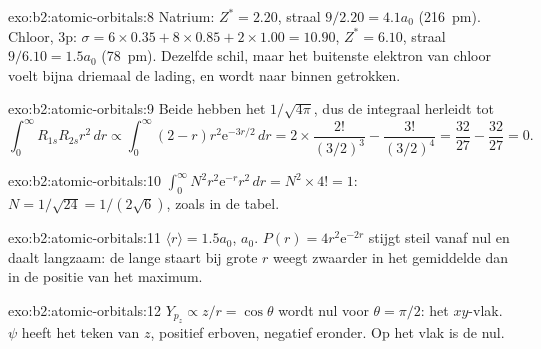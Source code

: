 \begin{solution}{exo:b2:atomic-orbitals:8}
Natrium: $Z^* = 2.20$, straal $9/2.20 = 4.1a_0$ (\qty{216}{pm}). Chloor, 3p:
$\sigma = 6 \times 0.35 + 8 \times 0.85 + 2 \times 1.00 = 10.90$, $Z^* = 6.10$, straal
$9/6.10 = 1.5a_0$ (\qty{78}{pm}). Dezelfde schil, maar het buitenste elektron van chloor
voelt bijna driemaal de lading, en wordt naar binnen getrokken.
\end{solution}

\begin{solution}{exo:b2:atomic-orbitals:9}
Beide hebben het  $1/\sqrt{4\pi}$, dus de integraal herleidt tot
\[
  \int_0^\infty R_{1s}R_{2s}r^2\,dr \propto \int_0^\infty (2 - r)r^2\mathrm e^{-3r/2}\,dr =
  2 \times \frac{2!}{(3/2)^3} - \frac{3!}{(3/2)^4} = \frac{32}{27} - \frac{32}{27} = 0 .
\]
\end{solution}

\begin{solution}{exo:b2:atomic-orbitals:10}
$\int_0^\infty N^2r^2\mathrm e^{-r}r^2\,dr = N^2 \times 4! = 1$: $N = 1/\sqrt{24} =
1/(2\sqrt6)$, zoals in de tabel.
\end{solution}

\begin{solution}{exo:b2:atomic-orbitals:11}
$\langle r\rangle = 1.5a_0$,  $a_0$. $P(r) = 4r^2\mathrm e^{-2r}$ stijgt
steil vanaf nul en daalt langzaam: de lange staart bij grote $r$ weegt zwaarder in het
gemiddelde dan in de positie van het maximum.
\end{solution}

\begin{solution}{exo:b2:atomic-orbitals:12}
$Y_{p_z} \propto z/r = \cos\theta$ wordt nul voor $\theta = \pi/2$: het $xy$-vlak.
$\psi$ heeft het teken van $z$, positief erboven, negatief eronder. Op het vlak is de
 nul.
\end{solution}

